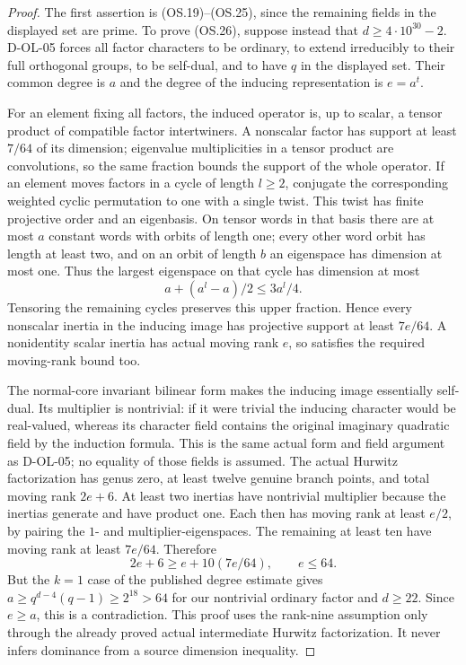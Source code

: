 \begin{proof}
The first assertion is (OS.19)--(OS.25), since the remaining fields
in the displayed set are prime.  To prove (OS.26), suppose instead
that $d\ge4\cdot10^{30}-2$.  D-OL-05 forces all factor characters
to be ordinary, to extend irreducibly to their full orthogonal
groups, to be self-dual, and to have $q$ in the displayed set.
Their common degree is $a$ and the degree of the inducing
representation is $e=a^t$.

For an element fixing all factors, the induced operator is, up to
scalar, a tensor product of compatible factor intertwiners.  A
nonscalar factor has support at least $7/64$ of its dimension;
eigenvalue multiplicities in a tensor product are convolutions,
so the same fraction bounds the support of the whole operator.
If an element moves factors in a cycle of length $l\ge2$, conjugate
the corresponding weighted cyclic permutation to one with a
single twist.  This twist has finite projective order and an
eigenbasis.  On tensor words in that basis there are at most $a$
constant words with orbits of length one; every other word orbit
has length at least two, and on an orbit of length $b$ an
eigenspace has dimension at most one.  Thus the largest eigenspace
on that cycle has dimension at most
\[
                    a+(a^l-a)/2\le3a^l/4.
 \tag{OS.27}
\]
Tensoring the remaining cycles preserves this upper fraction.
Hence every nonscalar inertia in the inducing image has projective
support at least $7e/64$.  A nonidentity scalar inertia has actual
moving rank $e$, so satisfies the required moving-rank bound too.

The normal-core invariant bilinear form makes the inducing image
essentially self-dual.  Its multiplier is nontrivial: if it were
trivial the inducing character would be real-valued, whereas its
character field contains the original imaginary quadratic field
by the induction formula.  This is the same actual form and field
argument as D-OL-05; no equality of those fields is assumed.
The actual Hurwitz factorization has genus zero, at least twelve
genuine branch points, and total moving rank $2e+6$.
At least two inertias have nontrivial multiplier because the
inertias generate and have product one.  Each then has moving
rank at least $e/2$, by pairing the $1$- and multiplier-eigenspaces.
The remaining at least ten have moving rank at least $7e/64$.
Therefore
\[
                 2e+6\ge e+10(7e/64),\qquad e\le64.
 \tag{OS.28}
\]
But the $k=1$ case of the published degree estimate
\cite[Theorem~3.7, pp.~165--167]{OL:GLT2024} gives
$a\ge q^{d-4}(q-1)\ge2^{18}>64$ for our nontrivial ordinary
factor and $d\ge22$.  Since $e\ge a$, this is a contradiction.
This proof uses the rank-nine assumption only through the already
proved actual intermediate Hurwitz factorization.  It never
infers dominance from a source dimension inequality.
\end{proof}
